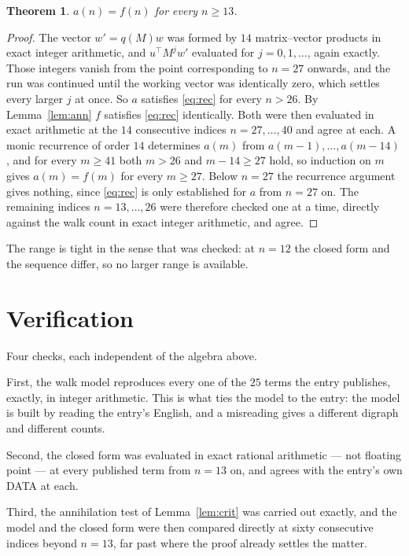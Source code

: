 \documentclass[11pt,a4paper]{article}
\theoremstyle{plain}
\newtheorem{theorem}{Theorem}
\theoremstyle{definition}
\begin{document}
\begin{theorem}
$a(n)=f(n)$ for every $n\ge13$.
\end{theorem}

\begin{proof}
The vector $w'=q(M)w$ was formed by $14$ matrix--vector products in exact integer
arithmetic, and $u^{\!\top}M^{j}w'$ evaluated for $j=0,1,\dots$, again exactly. Those integers
vanish from the point corresponding to $n=27$ onwards, and the run was continued until the
working vector was identically zero, which settles every larger $j$ at once. So $a$ satisfies
\eqref{eq:rec} for every $n>26$. By Lemma~\ref{lem:ann} $f$ satisfies \eqref{eq:rec}
identically. Both were then evaluated in exact arithmetic at the $14$ consecutive indices
$n=27,\dots,40$ and agree at each. A monic recurrence of order $14$
determines $a(m)$ from $a(m-1),\dots,a(m-14)$, and for every $m\ge41$ both
$m>26$ and $m-14\ge27$ hold, so induction on $m$ gives $a(m)=f(m)$ for every
$m\ge27$.
Below $n=27$ the recurrence argument gives nothing, since \eqref{eq:rec} is only
established for $a$ from $n=27$ on. The remaining indices $n=13,\dots,26$ were
therefore checked one at a time, directly against the walk count in exact integer arithmetic,
and agree.
\end{proof}

The range is tight in the sense that was checked: at $n=12$ the closed form and the sequence differ, so no larger range is available.

\section{Verification}

Four checks, each independent of the algebra above.

First, the walk model reproduces every one of the $25$ terms the entry publishes,
exactly, in integer arithmetic. This is what ties the model to the entry: the model is built
by reading the entry's English, and a misreading gives a different digraph and different
counts.

Second, the closed form was evaluated in exact rational arithmetic --- not floating point ---
at every published term from $n=13$ on, and agrees with the entry's own DATA at each.

Third, the annihilation test of Lemma~\ref{lem:crit} was carried out exactly, and the model
and the closed form were then compared directly at sixty consecutive indices beyond
$n=13$, far past where the proof already settles the matter.
\end{document}
